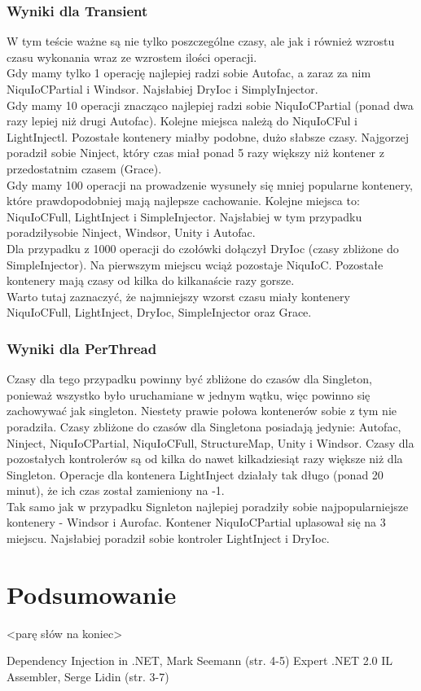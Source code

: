 \documentclass[12pt]{article}
\begin{document}
\subsubsection{Wyniki dla Transient}
W tym teście ważne są nie tylko poszczególne czasy, ale jak i również wzrostu czasu wykonania wraz ze wzrostem ilości operacji.\\
Gdy mamy tylko 1 operację najlepiej radzi sobie Autofac, a zaraz za nim NiquIoCPartial i Windsor. Najsłabiej DryIoc i SimplyInjector.\\
Gdy mamy 10 operacji znacząco najlepiej radzi sobie NiquIoCPartial (ponad dwa razy lepiej niż drugi Autofac). Kolejne miejsca należą do NiquIoCFul i LightInjectl. Pozostałe kontenery miałby podobne, dużo słabsze czasy. Najgorzej poradził sobie Ninject, który czas miał ponad 5 razy większy niż kontener z przedostatnim czasem (Grace).\\
Gdy mamy 100 operacji na prowadzenie wysuneły się mniej popularne kontenery, które prawdopodobniej mają najlepsze cachowanie. Kolejne miejsca to: NiquIoCFull, LightInject i SimpleInjector. Najsłabiej w tym przypadku poradziłysobie Ninject, Windsor, Unity i Autofac.\\
Dla przypadku z 1000 operacji do czołówki dołączył DryIoc (czasy zbliżone do SimpleInjector). Na pierwszym miejscu wciąż pozostaje NiquIoC. Pozostałe kontenery mają czasy od kilka do kilkanaście razy gorsze.\\
Warto tutaj zaznaczyć, że najmniejszy wzorst czasu miały kontenery NiquIoCFull, LightInject, DryIoc, SimpleInjector oraz Grace.

\subsubsection{Wyniki dla PerThread}
Czasy dla tego przypadku powinny być zbliżone do czasów dla Singleton, ponieważ wszystko było uruchamiane w jednym wątku, więc powinno się zachowywać jak singleton. Niestety prawie połowa kontenerów sobie z tym nie poradziła. Czasy zbliżone do czasów dla Singletona posiadają jedynie: Autofac, Ninject, NiquIoCPartial, NiquIoCFull, StructureMap, Unity i Windsor. Czasy dla pozostałych kontrolerów są od kilka do nawet kilkadziesiąt razy większe niż dla Singleton. Operacje dla kontenera LightInject działały tak długo (ponad 20 minut), że ich czas został zamieniony na -1.\\
Tak samo jak w przypadku Signleton najlepiej poradziły sobie najpopularniejsze kontenery - Windsor i Aurofac. Kontener NiquIoCPartial uplasował się na 3 miejscu. Najsłabiej poradził sobie kontroler LightInject i DryIoc.



\section{Podsumowanie}
<parę słów na koniec>

\newpage
\begin{thebibliography}{authordate1}
 Dependency Injection in .NET, Mark Seemann (str. 4-5)
 Expert .NET 2.0 IL Assembler, Serge Lidin (str. 3-7)
\end{thebibliography}
\end{document}
